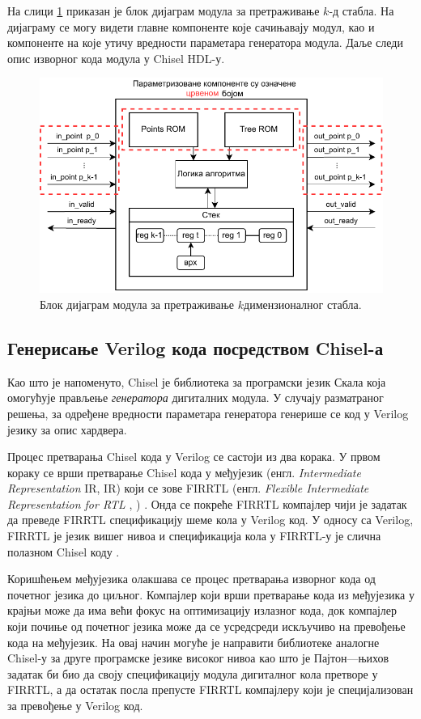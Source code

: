 \documentclass[master]{finthesis}
\makeatletter
\newcommand*{\engl}[2][\@empty]{%
    \edef\theacronym{#1}%
    (енгл. \foreignlanguage{english}{\emph{#2}%
    \ifx\theacronym\@empty \else , #1\fi})%
}
\newcommand*{\kdim}[1]{\texorpdfstring{$k$\Hyphdash}{k-}димензионал#1}
\newcommand*{\kd}{\texorpdfstring{$k$}{k}-д }
\makeatother
\begin{document}
На слици \ref{fig:kdblock} приказан је блок дијаграм модула за претраживање \kd стабла. На дијаграму се могу видети главне компоненте које сачињавају модул, као и компоненте на које утичу вредности параметара генератора модула. Даље следи опис изворног кода модула у Chisel HDL-у.

\clearpage
\begin{figure}
    \includegraphics[width=\linewidth]{slike/kd_block_sr.pdf}
    \caption{Блок дијаграм модула за претраживање \kdim{ног} стабла.}
    \label{fig:kdblock}
\end{figure}

\subsection{Генерисање Verilog кода посредством Chisel-а}

Као што је напоменуто, Chisel је библиотека за програмски језик Скала која омогућује прављење \emph{генератора} дигиталних модула. У случају разматраног решења, за одређене вредности параметара генератора генерише се код у Verilog језику за опис хардвера.

Процес претварања Chisel кода у Verilog се састоји из два корака. У првом кораку се врши претварање Chisel кода у међујезик \engl[IR]{Intermediate Representation} који се зове FIRRTL \engl{Flexible Intermediate Representation for RTL} \cite{firrtl}. Онда се покреће FIRRTL компајлер чији је задатак да преведе FIRRTL спецификацију шеме кола у Verilog код. У односу са Verilog, FIRRTL је језик вишег нивоа и спецификација кола у FIRRTL-у је слична полазном Chisel коду \cite{marija2017implementacija}.

Коришћењем међујезика олакшава се процес претварања изворног кода од почетног језика до циљног. Компајлер који врши претварање кода из међујезика у крајњи може да има већи фокус на оптимизацију излазног кода, док компајлер који почиње од почетног језика може да се усредсреди искључиво на превођење кода на међујезик. На овај начин могуће је направити библиотеке аналогне Chisel-у за друге програмске језике високог нивоа као што је Пајтон---њихов задатак би био да своју спецификацију модула дигиталног кола претворе у FIRRTL, а да остатак посла препусте FIRRTL компајлеру који је специјализован за превођење у Verilog код.
\end{document}
